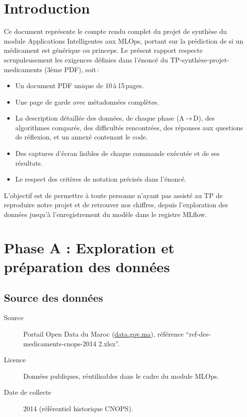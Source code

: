 \documentclass[12pt,a4paper]{report}
\begin{document}
\chapter*{Introduction}
Ce document représente le compte rendu complet du projet de synthèse du module Applications Intelligentes aux MLOps, portant sur la prédiction de si un médicament est générique ou princeps. Le présent rapport respecte scrupuleusement les exigences définies dans l'énoncé du TP-synthèse-projet-medicaments (3ème PDF), soit :

\begin{itemize}
    \item Un document PDF unique de 10 à 15 pages.
    \item Une page de garde avec métadonnées complètes.
    \item La description détaillée des données, de chaque phase (A → D), des algorithmes comparés, des difficultés rencontrées, des réponses aux questions de réflexion, et un annexé contenant le code.
    \item Des captures d'écran lisibles de chaque commande exécutée et de ses résultats.
    \item Le respect des critères de notation précisés dans l'énoncé.
\end{itemize}

L'objectif est de permettre à toute personne n'ayant pas assisté au TP de reproduire notre projet et de retrouver nos chiffres, depuis l'exploration des données jusqu'à l'enregistrement du modèle dans le registre MLflow.

\chapter*{Phase A : Exploration et préparation des données}

\section{Source des données}
\begin{description}
    \item[Source] Portail Open Data du Maroc (\url{data.gov.ma}), référence ``ref-des-medicaments-cnops-2014 2.xlsx''.
    \item[Licence] Données publiques, réutilisables dans le cadre du module MLOps.
    \item[Date de collecte] 2014 (référentiel historique CNOPS).
\end{description}
\end{document}

